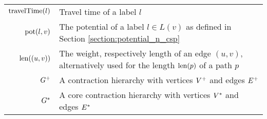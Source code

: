 \begin{tabular}{rp{}}
	$\operatorname{travelTime}(l)$          & Travel time of a label $l$                                                                                                                \\
	$\operatorname{pot}(l,v)$ & The potential of a label $l \in L(v)$ as defined in Section \ref{section:potential_n_csp}                                                 \\
	$\operatorname{len}((u,v))$             & The weight, respectively length of an edge $(u,v)$, alternatively used for the length $\operatorname{len}(p)$ of a path $p$                             \\
	$G^+$                     & A contraction hierarchy with vertices $V^+$ and edges $E^+$                                                                             \\
	$G^*$                 & A core contraction hierarchy with vertices $V^*$ and edges $E^*$                                                                \\
\end{tabular}



